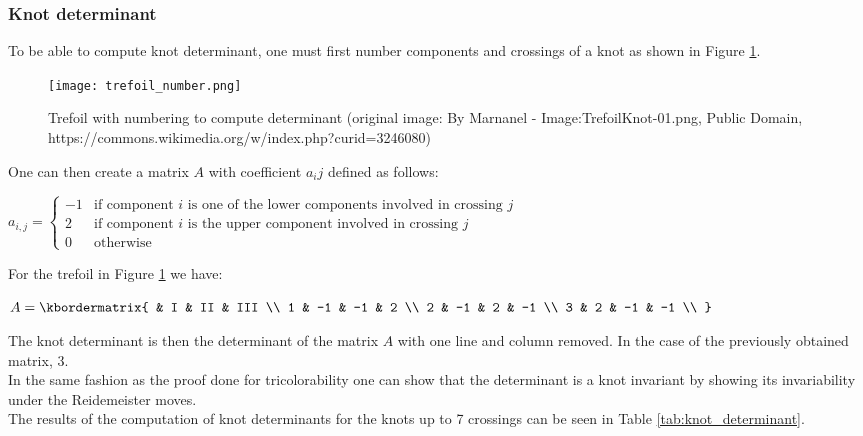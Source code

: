 \documentclass[12pt, a4paper]{article}
\begin{document}
\subsubsection{Knot determinant}

To be able to compute knot determinant, one must first number components and crossings of a knot as shown in Figure \ref{fig:trefoil_number}.

\begin{figure}[H]
  \centering
  \texttt{[image: trefoil\_number.png]}
  \caption{Trefoil with numbering to compute determinant (original image: By Marnanel - Image:TrefoilKnot-01.png, Public Domain, https://commons.wikimedia.org/w/index.php?curid=3246080)}
  \label{fig:trefoil_number}
\end{figure}

One can then create a matrix $A$ with coefficient $a_{i}{j}$ defined as follows:\\

\begin{center}
  $a_{i,j} =
  \begin{cases}
    -1 &\text{if component $i$ is one of the lower components involved in crossing $j$}\\
    2 &\text{if component $i$ is the upper component involved in crossing $j$}\\
    0 &\text{otherwise}
  \end{cases}$
\end{center}

For the trefoil in Figure \ref{fig:trefoil_number} we have:

\begin{center}
$
  A = \kbordermatrix{
    & I & II & III \\
    1 & -1 & -1 & 2  \\
    2 & -1 & 2 & -1  \\
    3 & 2 & -1 & -1  \\
  }
$
\end{center}

The knot determinant is then the determinant of the matrix $A$ with one line and column removed. In the case of the previously obtained matrix, 3.\\

In the same fashion as the proof done for tricolorability one can show that the determinant is a knot invariant by showing its invariability under the Reidemeister moves.\\

The results of the computation of knot determinants for the knots up to 7 crossings can be seen in Table \ref{tab:knot_determinant}.
\end{document}

